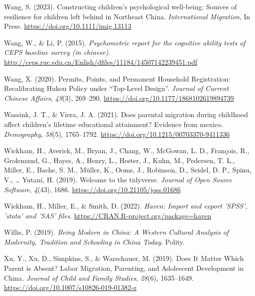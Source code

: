 \documentclass[
  man,floatsintext]{apa7}
\newlength{\cslhangindent}
\newlength{\cslentryspacingunit} %
\newenvironment{CSLReferences}[2] %
 {%
  \setlength{\parindent}{0pt}
  \ifodd #1
  \let\oldpar\par
  \def\par{\hangindent=\cslhangindent\oldpar}
  \fi
  \setlength{\parskip}{#2\cslentryspacingunit}
 }%
 {}
\begin{document}
\begin{CSLReferences}{1}{0}
\leavevmode{}%
Wang, S. (2023). Constructing children's psychological well-being: Sources of resilience for children left behind in Northeast China. \emph{International Migration}, In Press. \url{https://doi.org/10.1111/imig.13113}

\leavevmode{}%
Wang, W., \& Li, P. (2015). \emph{Psychometric report for the cognitive ability tests of CEPS baseline survey (in chinese)}. \url{http://ceps.ruc.edu.cn/Enlish/dfiles/11184/14507142239451.pdf}

\leavevmode{}%
Wang, X. (2020). Permits, Points, and Permanent Household Registration: Recalibrating Hukou Policy under {``}Top-Level Design{''}. \emph{Journal of Current Chinese Affairs}, \emph{49}(3), 269--290. \url{https://doi.org/10.1177/1868102619894739}

\leavevmode{}%
Wassink, J. T., \& Viera, J. A. (2021). Does parental migration during childhood affect children's lifetime educational attainment? Evidence from mexico. \emph{Demography}, \emph{58}(5), 1765--1792. \url{https://doi.org/10.1215/00703370-9411336}

\leavevmode{}%
Wickham, H., Averick, M., Bryan, J., Chang, W., McGowan, L. D., François, R., Grolemund, G., Hayes, A., Henry, L., Hester, J., Kuhn, M., Pedersen, T. L., Miller, E., Bache, S. M., Müller, K., Ooms, J., Robinson, D., Seidel, D. P., Spinu, V., \ldots{} Yutani, H. (2019). Welcome to the {tidyverse}. \emph{Journal of Open Source Software}, \emph{4}(43), 1686. \url{https://doi.org/10.21105/joss.01686}

\leavevmode{}%
Wickham, H., Miller, E., \& Smith, D. (2022). \emph{Haven: Import and export 'SPSS', 'stata' and 'SAS' files}. \url{https://CRAN.R-project.org/package=haven}

\leavevmode{}%
Willis, P. (2019). \emph{Being Modern in China: A Western Cultural Analysis of Modernity, Tradition and Schooling in China Today}. Polity.

\leavevmode{}%
Xu, Y., Xu, D., Simpkins, S., \& Warschauer, M. (2019). Does It Matter Which Parent is Absent? Labor Migration, Parenting, and Adolescent Development in China. \emph{Journal of Child and Family Studies}, \emph{28}(6), 1635--1649. \url{https://doi.org/10.1007/s10826-019-01382-z}


\end{CSLReferences}
\end{document}
